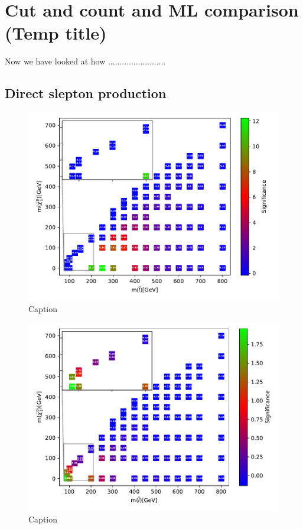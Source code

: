 \chapter{Cut and count and ML comparison (Temp title)}
\label{sec:results}
Now we have looked at how .........................
%
%

%



\section{Direct slepton production}
\label{sec:resSlepSlep}
\begin{figure}[H]
    \centering
    \includegraphics[width = \textwidth]{Figures/Significances/significanceCutandCount_slepslep_all.pdf}
    \caption{Caption}
    \label{fig:my_label}
\end{figure}

\begin{figure}
    \centering
    \includegraphics[width = \textwidth]{Figures/Significances/significance_BDT_slepslep_All_level.pdf}
    \caption{Caption}
    \label{fig:my_label}
\end{figure}


